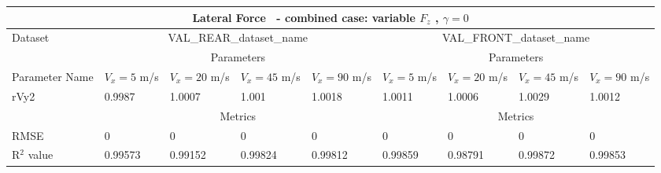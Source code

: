         \begin{tabular}{lllll|llll} \hline \multicolumn{9}{c}{Lateral Force~ - combined case: variable $F_z$ , $\gamma=0$}                                                                                                                                                                        \\ \hline Dataset                         & \multicolumn{4}{c|}{VAL\_REAR\_dataset\_name}                                                & \multicolumn{4}{c}{VAL\_FRONT\_dataset\_name}                                                     \\ \hline \multicolumn{1}{c}{}            & \multicolumn{4}{c|}{Parameters}                                                              & \multicolumn{4}{c}{Parameters}                                                                    \\ \hline Parameter Name                  & $V_x = 5$ m/s     & $V_x = 20$ m/s     & $V_x = 45$ m/s     & $V_x = 90$ m/s     & $V_x = 5$ m/s      & $V_x = 20$ m/s      & $V_x = 45$ m/s      & $V_x = 90$ m/s       \\ rVy2                            & 0.9987 & 1.0007 & 1.001 & 1.0018 & 1.0011 & 1.0006 & 1.0029 & 1.0012  \\ \hline \multicolumn{1}{c|}{}           & \multicolumn{4}{c|}{Metrics}                                                                 & \multicolumn{4}{c}{Metrics}                                                                       \\ \hline RMSE                            & 0 & 0 & 0 & 0 & 0 & 0 & 0 & 0  \\ R$^2$ value                       & 0.99573   & 0.99152   & 0.99824   & 0.99812   & 0.99859   & 0.98791   & 0.99872   & 0.99853    \\ \hline \end{tabular} 